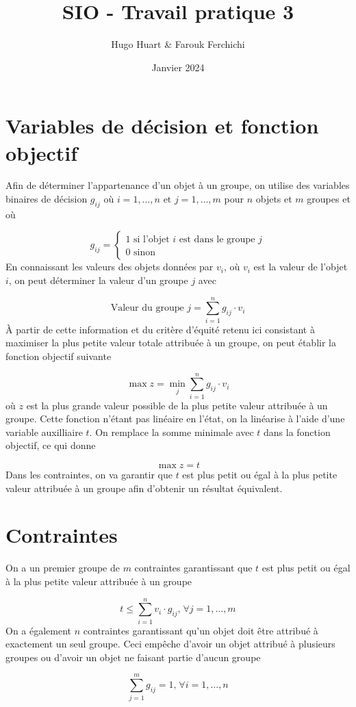 \documentclass[12pt]{article}
\title{SIO - Travail pratique 3}
\date{Janvier 2024}
\author{Hugo Huart \& Farouk Ferchichi}
\begin{document}
\maketitle

\section{Variables de décision et fonction objectif}

Afin de déterminer l'appartenance d'un objet à un groupe,
on utilise des variables binaires de décision $g_{ij}$ où $i=1,\ldots,n \text{ et } j=1,\ldots,m$
pour $n$ objets et $m$ groupes et où

\[
    g_{ij} =
    \begin{cases}
    1 \text{ si l'objet } i \text{ est dans le groupe } j  \\
    0 \text{ sinon}
    \end{cases}
\]
%
En connaissant les valeurs des objets données par $v_i$, où $v_i$ est la valeur de l'objet $i$, on
peut déterminer la valeur d'un groupe $j$ avec

\[
    \text{Valeur du groupe } j = \sum_{i=1}^{n}g_{ij} \cdot v_i
\]
%
À partir de cette information et du critère d'équité retenu ici consistant à maximiser
la plus petite valeur totale attribuée à un groupe, on peut établir la fonction objectif suivante

\[
    \max z = \min_{j} \sum_{i=1}^{n}g_{ij} \cdot v_i
\]
%
où $z$ est la plus grande valeur possible de la plus petite valeur attribuée à un groupe.
Cette fonction n'étant pas linéaire en l'état, on la linéarise à l'aide d'une
variable auxilliaire $t$. On remplace la somme minimale avec $t$ dans la fonction objectif, ce qui
donne

\[
    \max z = t
\]
%
Dans les contraintes, on va garantir que $t$ est plus petit ou égal à la plus petite valeur
attribuée à un groupe afin d'obtenir un résultat équivalent.

\pagebreak
\section{Contraintes}

On a un premier groupe de $m$ contraintes garantissant que $t$ est plus petit ou égal à la plus petite
valeur attribuée à un groupe

\[
    \tag{1} t \leq  \sum_{i = 1}^{n}{v_i \cdot g_{ij}} \text{,} \; \forall j = 1,\ldots,m
\]
%
On a également $n$ contraintes garantissant qu'un objet doit être attribué à exactement un seul
groupe. Ceci empêche d'avoir un objet attribué à plusieurs groupes ou d'avoir un
objet ne faisant partie d'aucun groupe

\[
    \tag{2} \sum_{j=1}^{m}{g_{ij} = 1} \text{,} \; \forall i = 1,\ldots,n
\]
\end{document}
